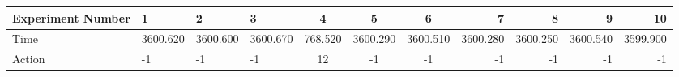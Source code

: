 \documentclass[8pt]{article}
\begin{document}
\begin{landscape}
\begin{tabular}{ | l | l | l | l | c | c | c | r | r | r | r | }
 \hline 
Experiment Number & 1 & 2 & 3 & 4 & 5 & 6 & 7 & 8 & 9 & 10\\ \hline
Time & 3600.620 & 3600.600 & 3600.670 & 768.520 & 3600.290 & 3600.510 & 3600.280 & 3600.250 & 3600.540 & 3599.900\\ \hline
Action & -1 & -1 & -1 & 12 & -1 & -1 & -1 & -1 & -1 & -1\\ \hline\end{tabular}
\end{landscape}
\end{document}
